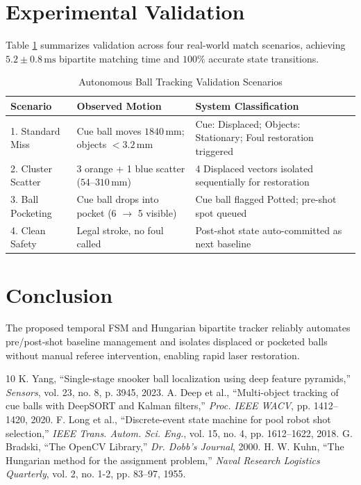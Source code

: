\documentclass[conference]{IEEEtran}
\begin{document}
\section{Experimental Validation}
Table \ref{tab:cases} summarizes validation across four real-world match scenarios, achieving $5.2 \pm 0.8\,\text{ms}$ bipartite matching time and $100\%$ accurate state transitions.

\begin{table}[htbp]
\centering
\caption{Autonomous Ball Tracking Validation Scenarios}
\label{tab:cases}
\scriptsize
\begin{tabular}{|l|p{2.7cm}|p{2.9cm}|}
\hline
\textbf{Scenario} & \textbf{Observed Motion} & \textbf{System Classification} \\
\hline
1. Standard Miss & Cue ball moves $1840\,\text{mm}$; objects $<3.2\,\text{mm}$ & Cue: Displaced; Objects: Stationary; Foul restoration triggered \\
2. Cluster Scatter & 3 orange + 1 blue scatter ($54$--$310\,\text{mm}$) & 4 Displaced vectors isolated sequentially for restoration \\
3. Ball Pocketing & Cue ball drops into pocket (6 $\to$ 5 visible) & Cue ball flagged Potted; pre-shot spot queued \\
4. Clean Safety & Legal stroke, no foul called & Post-shot state auto-committed as next baseline \\
\hline
\end{tabular}
\end{table}

\section{Conclusion}
The proposed temporal FSM and Hungarian bipartite tracker reliably automates pre/post-shot baseline management and isolates displaced or pocketed balls without manual referee intervention, enabling rapid laser restoration.


\begin{thebibliography}{10}
 K. Yang, ``Single-stage snooker ball localization using deep feature pyramids,'' \textit{Sensors}, vol. 23, no. 8, p. 3945, 2023.
 A. Deep et al., ``Multi-object tracking of cue balls with DeepSORT and Kalman filters,'' \textit{Proc. IEEE WACV}, pp. 1412--1420, 2020.
 F. Long et al., ``Discrete-event state machine for pool robot shot selection,'' \textit{IEEE Trans. Autom. Sci. Eng.}, vol. 15, no. 4, pp. 1612--1622, 2018.
 G. Bradski, ``The OpenCV Library,'' \textit{Dr. Dobb's Journal}, 2000.
 H. W. Kuhn, ``The Hungarian method for the assignment problem,'' \textit{Naval Research Logistics Quarterly}, vol. 2, no. 1-2, pp. 83--97, 1955.
\end{thebibliography}
\end{document}

